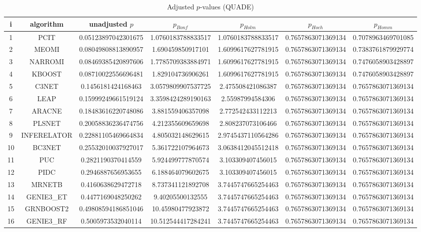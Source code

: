 \documentclass[a4paper,10pt]{article}
\begin{document}
\begin{landscape}
\begin{table}[!htp]
\centering\scriptsize
\caption{Adjusted $p$-values (QUADE)}
\begin{tabular}{ccccccc}
i&algorithm&unadjusted $p$&$p_{Bonf}$&$p_{Holm}$&$p_{Hoch}$&$p_{Homm}$\\
\hline
1&PCIT&0.05123897042301675&1.0760183788833517&1.0760183788833517&0.7657863071369134&0.7078963469701085\\
2&MEOMI&0.08049808813890957&1.690459850917101&1.6099617627781915&0.7657863071369134&0.7383761879929774\\
3&NARROMI&0.08469385420897606&1.7785709383884971&1.6099617627781915&0.7657863071369134&0.7476058903428897\\
4&KBOOST&0.08710022556696481&1.829104736906261&1.6099617627781915&0.7657863071369134&0.7476058903428897\\
5&C3NET&0.1456181424168463&3.0579809907537725&2.475508421086387&0.7657863071369134&0.7657863071369134\\
6&LEAP&0.15999249661519124&3.3598424289190163&2.55987994584306&0.7657863071369134&0.7657863071369134\\
7&ARACNE&0.18483616220748086&3.881559406357098&2.772542433112213&0.7657863071369134&0.7657863071369134\\
8&PLSNET&0.20058836236474756&4.212355609659698&2.808237073106466&0.7657863071369134&0.7657863071369134\\
9&INFERELATOR&0.22881105469664834&4.805032148629615&2.9745437110564286&0.7657863071369134&0.7657863071369134\\
10&BC3NET&0.25532010037927017&5.361722107964673&3.0638412045512418&0.7657863071369134&0.7657863071369134\\
11&PUC&0.2821190370414559&5.924499777870574&3.103309407456015&0.7657863071369134&0.7657863071369134\\
12&PIDC&0.2946887656953655&6.188464079602675&3.103309407456015&0.7657863071369134&0.7657863071369134\\
13&MRNETB&0.4160638629472718&8.737341121892708&3.7445747665254463&0.7657863071369134&0.7657863071369134\\
14&GENIE3_ET&0.4477169048250262&9.40205500132555&3.7445747665254463&0.7657863071369134&0.7657863071369134\\
15&GRNBOOST2&0.49808594186851046&10.45980477923872&3.7445747665254463&0.7657863071369134&0.7657863071369134\\
16&GENIE3_RF&0.5005973532040114&10.512544417284241&3.7445747665254463&0.7657863071369134&0.7657863071369134\\

\end{tabular}
\end{table}
\end{landscape}
\end{document}
